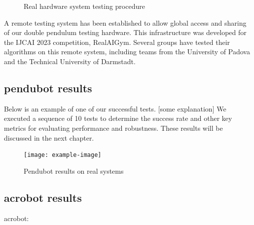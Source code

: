 \begin{figure}[htbp]
    \centering
    \caption{Real hardware system testing procedure}
    \label{fig:image_b}
\end{figure}

A remote testing system has been established to allow global access and sharing of our double pendulum testing hardware. This infrastructure was developed for the IJCAI 2023 competition, RealAIGym. Several groups have tested their algorithms on this remote system, including teams from the University of Padova and the Technical University of Darmstadt.

\subsection{pendubot results}
Below is an example of one of our successful tests. [some explanation] We executed a sequence of 10 tests to determine the success rate and other key metrics for evaluating performance and robustness. These results will be discussed in the next chapter. 

\begin{figure}[H]
    \centering
    \texttt{[image: example-image]}
    \caption{Pendubot results on real systems}
    \label{fig:my_label}
\end{figure}

\subsection{acrobot results}
acrobot:

\cleardoublepage
